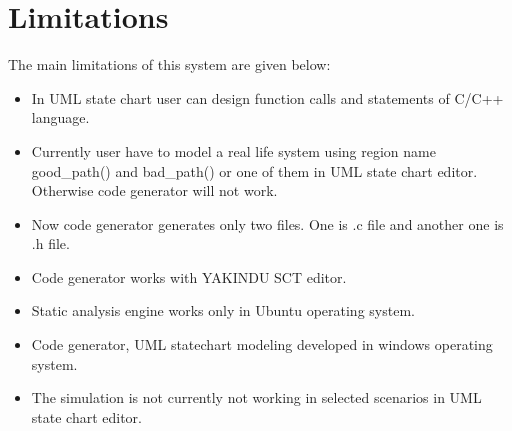 \chapter{Limitations}
The main limitations of this system are given below:
\begin{itemize}
	\item In UML state chart user can design function calls and statements of C/C++ language.
	
	\item Currently user have to model a real life system using region name good\_path() and bad\_path() or one of them in UML state chart editor. Otherwise code generator will not work.
	
	\item Now code generator generates only two files. One is .c file and another one is .h file.
	
	\item Code generator works with YAKINDU SCT editor.
	
	\item Static analysis engine works only in Ubuntu operating system.
	
	\item Code generator, UML statechart modeling developed in windows operating system.
	
	\item The simulation is not currently not working in selected scenarios in UML state chart editor.
	
\end{itemize}